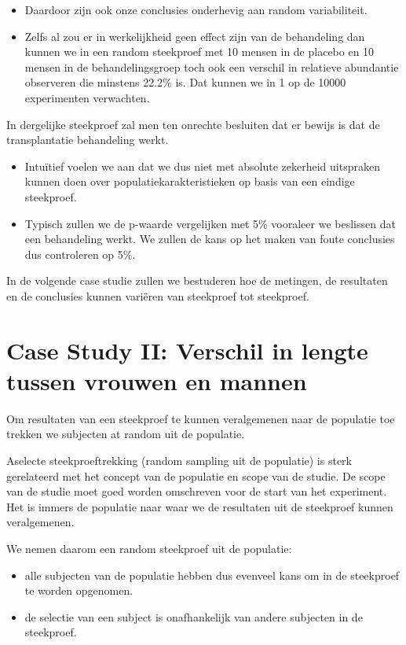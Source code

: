 \documentclass[
  dutch,
  letterpaper,
  12pt]{book}
\theoremstyle{definition}
\theoremstyle{definition}
\theoremstyle{definition}
\theoremstyle{remark}
\begin{document}
\begin{itemize}
\item
  Daardoor zijn ook onze conclusies onderhevig aan random variabiliteit.
\item
  Zelfs al zou er in werkelijkheid geen effect zijn van de behandeling
  dan kunnen we in een random steekproef met 10 mensen in de placebo en
  10 mensen in de behandelingsgroep toch ook een verschil in relatieve
  abundantie observeren die minstens 22.2\% is. Dat kunnen we in 1 op de
  10000 experimenten verwachten.
\end{itemize}

In dergelijke steekproef zal men ten onrechte besluiten dat er bewijs is
dat de transplantatie behandeling werkt.

\begin{itemize}
\item
  Intuïtief voelen we aan dat we dus niet met absolute zekerheid
  uitspraken kunnen doen over populatiekarakteristieken op basis van een
  eindige steekproef.
\item
  Typisch zullen we de p-waarde vergelijken met 5\% vooraleer we
  beslissen dat een behandeling werkt. We zullen de kans op het maken
  van foute conclusies dus controleren op 5\%.
\end{itemize}

In de volgende case studie zullen we bestuderen hoe de metingen, de
resultaten en de conclusies kunnen variëren van steekproef tot
steekproef.

\section{Case Study II: Verschil in lengte tussen vrouwen en
mannen}\label{case-study-ii-verschil-in-lengte-tussen-vrouwen-en-mannen}

Om resultaten van een steekproef te kunnen veralgemenen naar de
populatie toe trekken we subjecten at random uit de populatie.

Aselecte steekproeftrekking (random sampling uit de populatie) is sterk
gerelateerd met het concept van de populatie en scope van de studie. De
scope van de studie moet goed worden omschreven voor de start van het
experiment. Het is immers de populatie naar waar we de resultaten uit de
steekproef kunnen veralgemenen.

We nemen daarom een random steekproef uit de populatie:

\begin{itemize}
\item
  alle subjecten van de populatie hebben dus evenveel kans om in de
  steekproef te worden opgenomen.
\item
  de selectie van een subject is onafhankelijk van andere subjecten in
  de steekproef.
\end{itemize}
\end{document}
